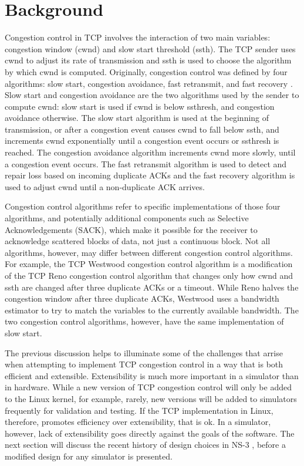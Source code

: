 \documentclass[11pt]{ucthesis}
\begin{document}
\section{Background}

Congestion control in TCP involves the interaction of two main variables: congestion window (cwnd) and slow start threshold (ssth). The TCP sender uses cwnd to adjust its rate of transmission and ssth is used to choose the algorithm by which cwnd is computed. Originally, congestion control was defined by four algorithms: slow start, congestion avoidance, fast retransmit, and fast recovery \cite{RFC5681}. Slow start and congestion avoidance are the two algorithms used by the sender to compute cwnd: slow start is used if cwnd is below ssthresh, and congestion avoidance otherwise. The slow start algorithm is used at the beginning of transmission, or after a congestion event causes cwnd to fall below ssth, and increments cwnd exponentially until a congestion event occurs or ssthresh is reached. The congestion avoidance algorithm increments cwnd more slowly, until a congestion event occurs. The fast retransmit algorithm is used to detect and repair loss based on incoming duplicate ACKs and the fast recovery algorithm is used to adjust cwnd until a non-duplicate ACK arrives. 

Congestion control algorithms refer to specific implementations of those four algorithms, and potentially additional components such as Selective Acknowledgements (SACK), which make it possible for the receiver to acknowledge scattered blocks of data, not just a continuous block. Not all algorithms, however, may differ between different congestion control algorithms. For example, the TCP Westwood \cite{WW} congestion control algorithm is a modification of the TCP Reno congestion control algorithm that changes only how cwnd and ssth are changed after three duplicate ACKs or a timeout. While Reno halves the congestion window after three duplicate ACKs, Westwood uses a bandwidth estimator to try to match the variables to the currently available bandwidth. The two congestion control algorithms, however, have the same implementation of slow start. 

The previous discussion helps to illuminate some of the challenges that arrise when attempting to implement TCP congestion control in a way that is both efficient and extensible. Extensibility is much more important in a simulator than in hardware. While a new version of TCP congestion control will only be added to the Linux kernel, for example, rarely, new versions will be added to simulators frequently for validation and testing. If the TCP implementation in Linux, therefore, promotes efficiency over extensibility, that is ok. In a simulator, however, lack of extensibility goes directly against the goals of the software. The next section will discuss the recent history of design choices in NS-3 , before a modified design for any simulator is presented. 
\end{document}
